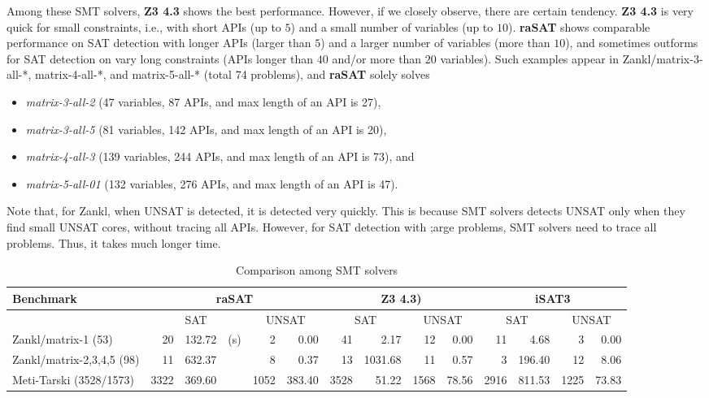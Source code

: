 \documentclass[runningheads,a4paper,oribibl]{llncs}
\begin{document}
Among these SMT solvers, {\bf Z3 4.3} shows the best performance. 
However, if we closely observe, there are certain tendency. 
{\bf Z3 4.3} is very quick for small constraints, i.e., with 
short APIs (up to $5$) and a small number of variables (up to $10$). 
{\bf raSAT} shows comparable performance on SAT detection with 
longer APIs (larger than $5$) and a larger number of variables (more than $10$), 
and sometimes outforms for SAT detection on vary long constraints 
(APIs longer than $40$ and/or more than $20$ variables). 
Such examples appear in Zankl/matrix-3-all-*, matrix-4-all-*, and matrix-5-all-* 
(total 74 problems), and {\bf raSAT} solely solves 
\begin{itemize}
\item {\em matrix-3-all-2} (47 variables, 87 APIs, and max length of an API is 27), 
\item {\em matrix-3-all-5} (81 variables, 142 APIs, and max length of an API is 20), 
\item {\em matrix-4-all-3} (139 variables, 244 APIs, and max length of an API is 73), and 
\item {\em matrix-5-all-01} (132 variables, 276 APIs, and max length of an API is 47). 
\end{itemize}
Note that, for Zankl, when UNSAT is detected, it is detected very quickly. 
This is because SMT solvers detects UNSAT only when they find small UNSAT cores, 
without tracing all APIs. However, for SAT detection with ;arge problems, 
SMT solvers need to trace all problems. Thus, it takes much longer time. 

\begin{table}[t]
\centering
\begin{tabular}{ | l | r | r  r | r | r  | r | r | r | r | r | r |r | r |}
\hline
    \multicolumn{1}{|l|}{Benchmark} & 
    \multicolumn{5}{c|}{\bf raSAT} & \multicolumn{4}{c|}{\bf Z3 4.3)} & \multicolumn{4}{c|}{\bf iSAT3} \\
\hline
    & \multicolumn{3}{|c|}{SAT} & \multicolumn{2}{|c|}{UNSAT} & \multicolumn{2}{|c|}{SAT} 
    & \multicolumn{2}{|c|}{UNSAT} & \multicolumn{2}{|c|}{SAT} & \multicolumn{2}{|c|}{UNSAT} \\
\hline
Zankl/matrix-1 (53) & 20 & 132.72 & (s) & 2 & 0.00 & 41 & 2.17 & 12 & 0.00 & 11 & 4.68 & 3 & 0.00 \\
\hline
Zankl/matrix-2,3,4,5 (98) & 11 & 632.37 && 8 & 0.37 & 13 & 1031.68 & 11 & 0.57 & 3 & 196.40 & 12 & 8.06 \\
\hline 
Meti-Tarski (3528/1573) & 3322 & 369.60 && 1052 & 383.40 & 3528 & 51.22 & 1568 & 78.56 & 2916 & 811.53 & 
1225 & 73.83 \\
\hline
\end{tabular}
\medskip 
\caption{Comparison among SMT solvers} \label{tab:comparison}
\end{table}
\end{document}
